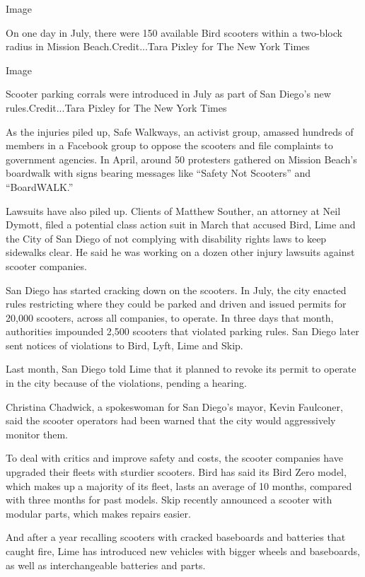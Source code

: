 Image

On one day in July, there were 150 available Bird scooters within a
two-block radius in Mission Beach.Credit...Tara Pixley for The New York
Times

Image

Scooter parking corrals were introduced in July as part of San Diego's
new rules.Credit...Tara Pixley for The New York Times

As the injuries piled up, Safe Walkways, an activist group, amassed
hundreds of members in a Facebook group to oppose the scooters and file
complaints to government agencies. In April, around 50 protesters
gathered on Mission Beach's boardwalk with signs bearing messages like
``Safety Not Scooters'' and ``BoardWALK.''

Lawsuits have also piled up. Clients of Matthew Souther, an attorney at
Neil Dymott, filed a potential class action suit in March that accused
Bird, Lime and the City of San Diego of not complying with disability
rights laws to keep sidewalks clear. He said he was working on a dozen
other injury lawsuits against scooter companies.

San Diego has started cracking down on the scooters. In July, the city
enacted rules restricting where they could be parked and driven and
issued permits for 20,000 scooters, across all companies, to operate. In
three days that month, authorities impounded 2,500 scooters that
violated parking rules. San Diego later sent notices of violations to
Bird, Lyft, Lime and Skip.

Last month, San Diego told Lime that it planned to revoke its permit to
operate in the city because of the violations, pending a hearing.

Christina Chadwick, a spokeswoman for San Diego's mayor, Kevin
Faulconer, said the scooter operators had been warned that the city
would aggressively monitor them.

To deal with critics and improve safety and costs, the scooter companies
have upgraded their fleets with sturdier scooters. Bird has said its
Bird Zero model, which makes up a majority of its fleet, lasts an
average of 10 months, compared with three months for past models. Skip
recently announced a scooter with modular parts, which makes repairs
easier.

And after a year recalling scooters with cracked baseboards and
batteries that caught fire, Lime has introduced new vehicles with bigger
wheels and baseboards, as well as interchangeable batteries and parts.

